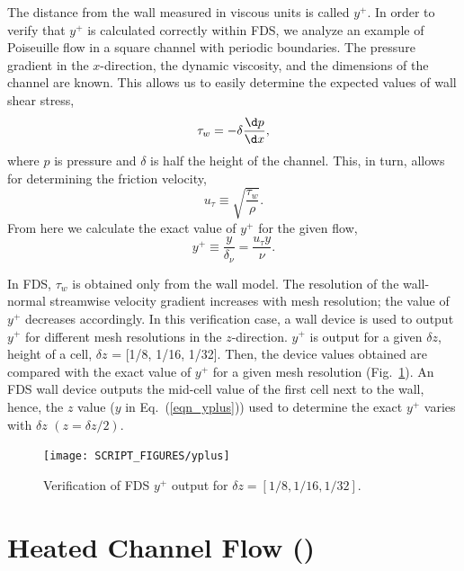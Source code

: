 \documentclass[11pt]{book}
\begin{document}
\noindent The distance from the wall measured in viscous units is called $y^+$. In order to verify that $y^+$ is calculated correctly within FDS, we analyze an example of Poiseuille flow in a square channel with periodic boundaries. The pressure gradient in the $x$-direction, the dynamic viscosity, and the dimensions of the channel are known. This allows us to easily determine the expected values of wall shear stress,
\begin{equation}
\label{wall stress}
\tau_w = - \delta \frac{\d p}{\d x},
\end{equation}
where $p$ is pressure and $\delta$ is half the height of the channel. This, in turn, allows for determining the friction velocity,
\begin{equation}
\label{friction velocity}
u_{\tau} \equiv \sqrt{{\frac{\tau_w}{\rho}}}.
\end{equation}
From here we calculate the exact value of $y^+$ for the given flow,
\begin{equation}
\label{eqn_yplus}
y^+ \equiv \frac{y}{\delta_{\nu}} = \frac{u_{\tau}y}{\nu}.
\end{equation}

In FDS, $\tau_w$ is obtained only from the wall model. The resolution of the wall-normal streamwise velocity gradient increases with  mesh resolution; the value of $y^+$ decreases accordingly. In this verification case, a wall device is used to output $y^+$ for different mesh resolutions in the $z$-direction. $y^+$ is output for a given $\delta z$, height of a cell, $\delta z$ = [1/8, 1/16, 1/32]. Then, the device values obtained are compared with the exact value of $y^+$ for a given mesh resolution (Fig.~\ref{fig_yplus}). An FDS wall device outputs the mid-cell value of the first cell next to the wall, hence, the $z$ value ($y$ in Eq.~(\ref{eqn_yplus})) used to determine the exact $y^+$ varies with $\delta z$ $(z = \delta z/2)$.

\begin{figure}[ht]
\centering
\texttt{[image: SCRIPT\_FIGURES/yplus]}
\caption[Near-wall grid resolution]{Verification of FDS $y^+$ output for $\delta z=[1/8, 1/16, 1/32]$.}
\label{fig_yplus}
\end{figure}


\section{Heated Channel Flow (\texorpdfstring{}{heated\_channel})}
\end{document}
